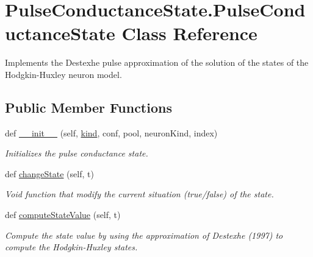 \hypertarget{class_pulse_conductance_state_1_1_pulse_conductance_state}{}\section{Pulse\+Conductance\+State.\+Pulse\+Conductance\+State Class Reference}
\label{class_pulse_conductance_state_1_1_pulse_conductance_state}


Implements the Destexhe pulse approximation of the solution of the states of the Hodgkin-\/\+Huxley neuron model.  


\subsection*{Public Member Functions}
\begin{DoxyCompactItemize}
\item 
def \hyperlink{class_pulse_conductance_state_1_1_pulse_conductance_state_af313a2dfe2617230969fa4db3cce45d1}{\+\_\+\+\_\+init\+\_\+\+\_\+} (self, \hyperlink{class_pulse_conductance_state_1_1_pulse_conductance_state_a53d237daaa4815ad375e2377da89845e}{kind}, conf, pool, neuron\+Kind, index)
\begin{DoxyCompactList}\small\item\em Initializes the pulse conductance state. \end{DoxyCompactList}\item 
def \hyperlink{class_pulse_conductance_state_1_1_pulse_conductance_state_aefa0c1896447406edf39420111e19a82}{change\+State} (self, t)
\begin{DoxyCompactList}\small\item\em Void function that modify the current situation (true/false) of the state. \end{DoxyCompactList}\item 
def \hyperlink{class_pulse_conductance_state_1_1_pulse_conductance_state_ac4fa668247190566ffc9bccda61dcd81}{compute\+State\+Value} (self, t)
\begin{DoxyCompactList}\small\item\em Compute the state value by using the approximation of Destexhe (1997) to compute the Hodgkin-\/\+Huxley states. \end{DoxyCompactList}\end{DoxyCompactItemize}
